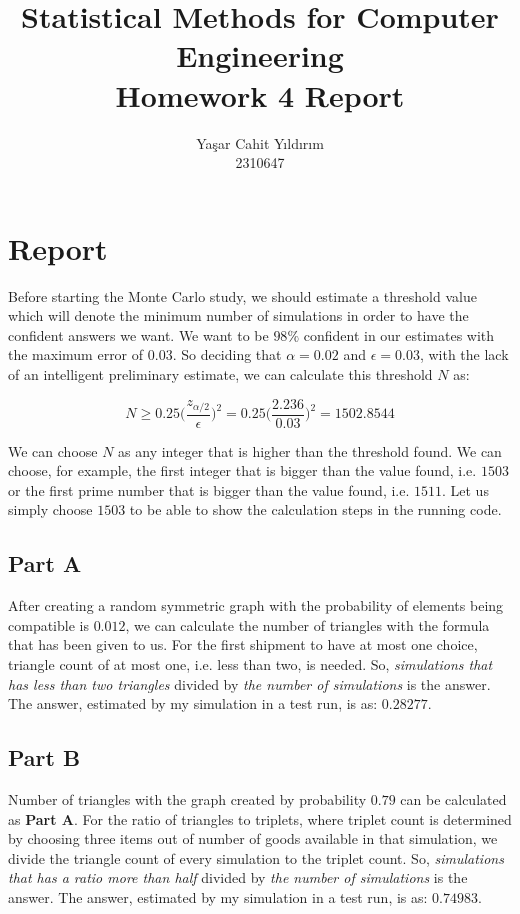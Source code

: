 \documentclass{article}
\title{
    \vspace{4cm}
    \huge\textbf{Statistical Methods for Computer Engineering} \\
    \huge Homework 4 Report
}
\author{
    \Large Yaşar Cahit Yıldırım \\
    \Large 2310647
}
\date{}
\begin{document}
    \maketitle
    \newpage
    
    \section*{\hfil Report \hfil}
    
        Before starting the Monte Carlo study, we should estimate a threshold value which will denote the minimum number of simulations in order to have the confident answers we want. We want to be $98\%$ confident in our estimates with the maximum error of $0.03$. So deciding that $\alpha = 0.02$ and $\epsilon = 0.03$, with the lack of an intelligent preliminary estimate, we can calculate this threshold $N$ as:

        $$N \geq 0.25\Big(\frac{z_{\alpha/2}}{\epsilon}\Big)^2 = 0.25\Big(\frac{2.236}{0.03}\Big)^2 = 1502.8544$$

        We can choose $N$ as any integer that is higher than the threshold found. We can choose, for example, the first integer that is bigger than the value found, i.e. $1503$ or the first prime number that is bigger than the value found, i.e. $1511$. Let us simply choose $1503$ to be able to show the calculation steps in the running code.


        \subsection*{Part A}
            After creating a random symmetric graph with the probability of elements being compatible is $0.012$, we can calculate the number of triangles with the formula that has been given to us. For the first shipment to have at most one choice, triangle count of at most one, i.e. less than two, is needed. So, \textit{simulations that has less than two triangles} divided by \textit{the number of simulations} is the answer.
            The answer, estimated by my simulation in a test run, is as: $0.28277$.


        \subsection*{Part B}
            Number of triangles with the graph created by probability $0.79$ can be calculated as \textbf{Part A}. For the ratio of triangles to triplets, where triplet count is determined by choosing three items out of number of goods available in that simulation, we divide the triangle count of every simulation to the triplet count. So, \textit{simulations that has a ratio more than half} divided by \textit{the number of simulations} is the answer.
            The answer, estimated by my simulation in a test run, is as: $0.74983$.
\end{document}
